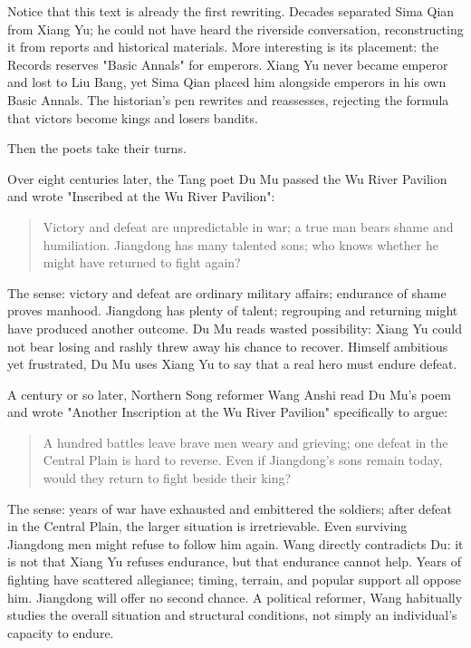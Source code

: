 Notice that this text is already the first rewriting. Decades separated Sima Qian from Xiang Yu; he could not have heard the riverside conversation, reconstructing it from reports and historical materials. More interesting is its placement: the Records reserves "Basic Annals" for emperors. Xiang Yu never became emperor and lost to Liu Bang, yet Sima Qian placed him alongside emperors in his own Basic Annals. The historian's pen rewrites and reassesses, rejecting the formula that victors become kings and losers bandits.

Then the poets take their turns.

Over eight centuries later, the Tang poet Du Mu passed the Wu River Pavilion and wrote "Inscribed at the Wu River Pavilion":

\begin{quote}
Victory and defeat are unpredictable in war; a true man bears shame and humiliation. Jiangdong has many talented sons; who knows whether he might have returned to fight again?
\end{quote}
The sense: victory and defeat are ordinary military affairs; endurance of shame proves manhood. Jiangdong has plenty of talent; regrouping and returning might have produced another outcome. Du Mu reads wasted possibility: Xiang Yu could not bear losing and rashly threw away his chance to recover. Himself ambitious yet frustrated, Du Mu uses Xiang Yu to say that a real hero must endure defeat.

A century or so later, Northern Song reformer Wang Anshi read Du Mu's poem and wrote "Another Inscription at the Wu River Pavilion" specifically to argue:

\begin{quote}
A hundred battles leave brave men weary and grieving; one defeat in the Central Plain is hard to reverse. Even if Jiangdong's sons remain today, would they return to fight beside their king?
\end{quote}
The sense: years of war have exhausted and embittered the soldiers; after defeat in the Central Plain, the larger situation is irretrievable. Even surviving Jiangdong men might refuse to follow him again. Wang directly contradicts Du: it is not that Xiang Yu refuses endurance, but that endurance cannot help. Years of fighting have scattered allegiance; timing, terrain, and popular support all oppose him. Jiangdong will offer no second chance. A political reformer, Wang habitually studies the overall situation and structural conditions, not simply an individual's capacity to endure.

